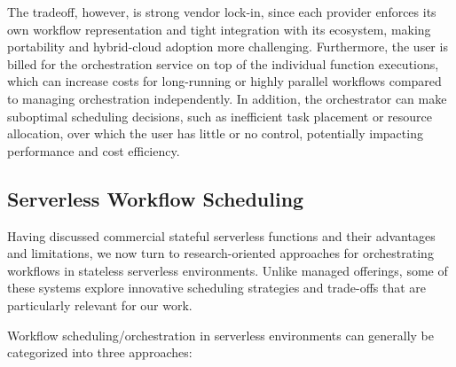 The tradeoff, however, is strong vendor lock-in, since each provider enforces its own workflow representation and tight integration with its ecosystem, making portability and hybrid-cloud adoption more challenging. Furthermore, the user is billed for the orchestration service on top of the individual function executions, which can increase costs for long-running or highly parallel workflows compared to managing orchestration independently. In addition, the orchestrator can make suboptimal scheduling decisions, such as inefficient task placement or resource allocation, over which the user has little or no control, potentially impacting performance and cost efficiency.

\subsection{Serverless Workflow Scheduling}
Having discussed commercial stateful serverless functions and their advantages and limitations, we now turn to research-oriented approaches for orchestrating workflows in stateless serverless environments. Unlike managed offerings, some of these systems explore innovative scheduling strategies and trade-offs that are particularly relevant for our work.

Workflow scheduling/orchestration in serverless environments can generally be categorized into three approaches:

